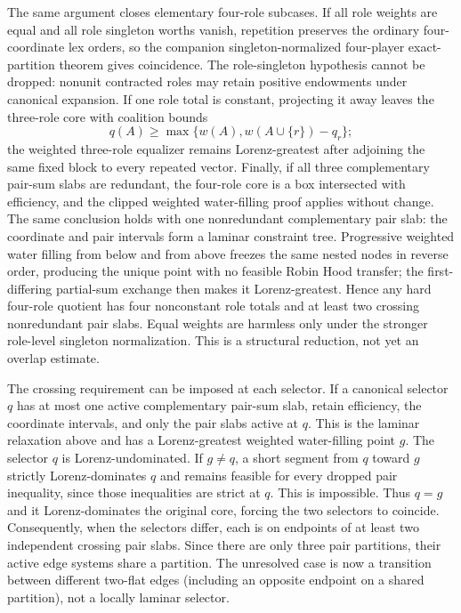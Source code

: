 \documentclass[11pt]{article}
\begin{document}
The same argument closes elementary four-role subcases.  If all role weights
are equal and all role singleton worths vanish, repetition preserves the
ordinary four-coordinate lex orders, so the companion singleton-normalized
four-player exact-partition theorem gives coincidence.  The role-singleton
hypothesis cannot be dropped: nonunit contracted roles may retain positive
endowments under canonical expansion.  If one role total is constant,
projecting it away leaves the
three-role core with coalition bounds
\[
 q(A)\ge\max\{w(A),w(A\cup\{r\})-q_r\};
\]
the weighted three-role equalizer remains Lorenz-greatest after adjoining the
same fixed block to every repeated vector.  Finally, if all three
complementary pair-sum slabs are redundant, the four-role core is a box
intersected with efficiency, and the clipped weighted water-filling proof
applies without change.  The same conclusion holds with one nonredundant
complementary pair slab: the coordinate and pair intervals form a laminar
constraint tree.  Progressive weighted water filling from below and from
above freezes the same nested nodes in reverse order, producing the unique
point with no feasible Robin Hood transfer; the first-differing partial-sum
exchange then makes it Lorenz-greatest.  Hence any hard four-role quotient
has four nonconstant role totals and at least two crossing nonredundant pair
slabs.  Equal weights are harmless only under the stronger role-level
singleton normalization.  This is a structural reduction, not yet an
overlap estimate.

The crossing requirement can be imposed at each selector.  If a canonical
selector $q$ has at most one active complementary pair-sum slab, retain
efficiency, the coordinate intervals, and only the pair slabs active at
$q$.  This is the laminar relaxation above and has a Lorenz-greatest weighted
water-filling point $g$.  The selector $q$ is Lorenz-undominated.  If
$g\ne q$, a short segment from $q$ toward $g$ strictly Lorenz-dominates
$q$ and remains feasible for every dropped pair inequality, since those
inequalities are strict at $q$.  This is impossible.  Thus $q=g$ and it
Lorenz-dominates the original core, forcing the two selectors to coincide.
Consequently, when the selectors differ, each is on endpoints of at least
two independent crossing pair slabs.  Since there are only three pair
partitions, their active edge systems share a partition.  The unresolved
case is now a transition between different two-flat edges (including an
opposite endpoint on a shared partition), not a locally laminar selector.
\end{document}
